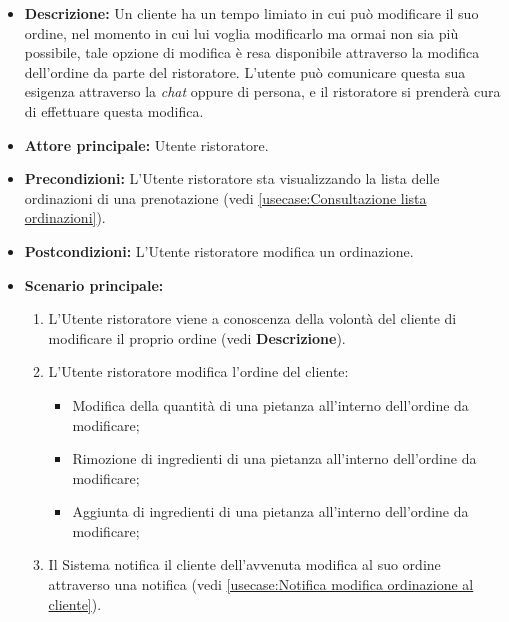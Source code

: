 \label{usecase:Modifica ordinazione}
\begin{itemize}

    \item \textbf{Descrizione:} Un cliente ha un tempo limiato in cui può modificare il suo ordine, nel momento in cui lui voglia modificarlo ma ormai non sia più possibile, tale opzione di modifica è resa disponibile 
    attraverso la modifica dell'ordine da parte del ristoratore. L'utente può comunicare questa sua esigenza attraverso la \textit{chat} oppure di persona, e il ristoratore si prenderà cura di effettuare questa modifica.
	
    \item \textbf{Attore principale:} Utente ristoratore.

	\item \textbf{Precondizioni:} L'Utente ristoratore sta visualizzando la lista delle ordinazioni di una prenotazione (vedi \autoref{usecase:Consultazione lista ordinazioni}).

	\item \textbf{Postcondizioni:} L'Utente ristoratore modifica un ordinazione.

	\item \textbf{Scenario principale:}
	\begin{enumerate}
		\item L'Utente ristoratore viene a conoscenza della volontà del cliente di modificare il proprio ordine (vedi \textbf{Descrizione}).
		\item L'Utente ristoratore modifica l'ordine del cliente:
		\begin{itemize}
            \item Modifica della quantità di una pietanza all'interno dell'ordine da modificare;
			\item Rimozione di ingredienti di una pietanza all'interno dell'ordine da modificare;
			\item Aggiunta di ingredienti di una pietanza all'interno dell'ordine da modificare; 
        \end{itemize}
        \item Il Sistema notifica il cliente dell'avvenuta modifica al suo ordine attraverso una notifica (vedi \autoref{usecase:Notifica modifica ordinazione al cliente}).
	\end{enumerate}

\end{itemize}


